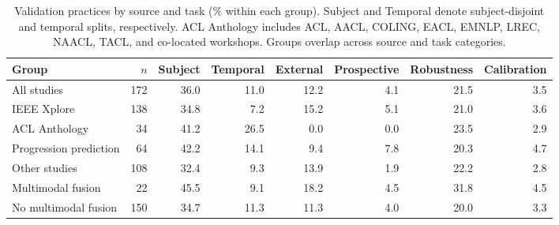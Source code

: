 \documentclass[11pt]{article}
\theoremstyle{plain}
\theoremstyle{definition}
\theoremstyle{remark}
\begin{document}
\begin{table}[!t]
\centering
\small
\setlength{\tabcolsep}{4pt}
\renewcommand{\arraystretch}{1.05}

\begin{tabular*}{\textwidth}{
  @{\extracolsep{\fill}}lrrrrrrr@{}
}
\toprule
\rowcolor{gray!18}
\textbf{Group} &
\textbf{$n$} &
\textbf{Subject} &
\textbf{Temporal} &
\textbf{External} &
\textbf{Prospective} &
\textbf{Robustness} &
\textbf{Calibration} \\
\midrule
All studies           & 172 & 36.0 & 11.0 & 12.2 & 4.1 & 21.5 & 3.5 \\
\midrule
IEEE Xplore           & 138 & 34.8 &  7.2 & 15.2 & 5.1 & 21.0 & 3.6 \\
ACL Anthology         &  34 & 41.2 & 26.5 &  0.0 & 0.0 & 23.5 & 2.9 \\
\midrule
Progression prediction &  64 & 42.2 & 14.1 &  9.4 & 7.8 & 20.3 & 4.7 \\
Other studies          & 108 & 32.4 &  9.3 & 13.9 & 1.9 & 22.2 & 2.8 \\
\midrule
Multimodal fusion      &  22 & 45.5 &  9.1 & 18.2 & 4.5 & 31.8 & 4.5 \\
No multimodal fusion   & 150 & 34.7 & 11.3 & 11.3 & 4.0 & 20.0 & 3.3 \\
\bottomrule
\end{tabular*}

\caption{Validation practices by source and task
(\% within each group). Subject and Temporal denote
subject-disjoint and temporal splits, respectively.
ACL Anthology includes ACL, AACL, COLING, EACL, EMNLP,
LREC, NAACL, TACL, and co-located workshops.
Groups overlap across source and task categories.}
\label{tab:crossdim_validation}
\end{table}
\end{document}
